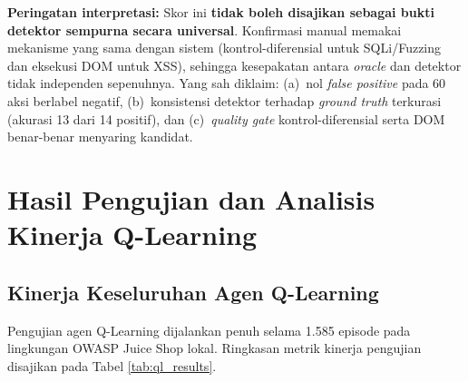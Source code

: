 \begin{enumerate}
\textbf{Peringatan interpretasi:} Skor ini \textbf{tidak boleh disajikan sebagai bukti detektor sempurna secara universal}. Konfirmasi manual memakai mekanisme yang sama dengan sistem (kontrol-diferensial untuk SQLi/Fuzzing dan eksekusi DOM untuk XSS), sehingga kesepakatan antara \textit{oracle} dan detektor tidak independen sepenuhnya. Yang sah diklaim: (a)~nol \textit{false positive} pada 60 aksi berlabel negatif, (b)~konsistensi detektor terhadap \textit{ground truth} terkurasi (akurasi 13 dari 14 positif), dan (c)~\textit{quality gate} kontrol-diferensial serta DOM benar-benar menyaring kandidat.


\section{Hasil Pengujian dan Analisis Kinerja Q-Learning}

\subsection{Kinerja Keseluruhan Agen Q-Learning}

Pengujian agen Q-Learning dijalankan penuh selama 1.585 episode pada lingkungan OWASP Juice Shop lokal. Ringkasan metrik kinerja pengujian disajikan pada Tabel \ref{tab:ql_results}.


\end{enumerate}
